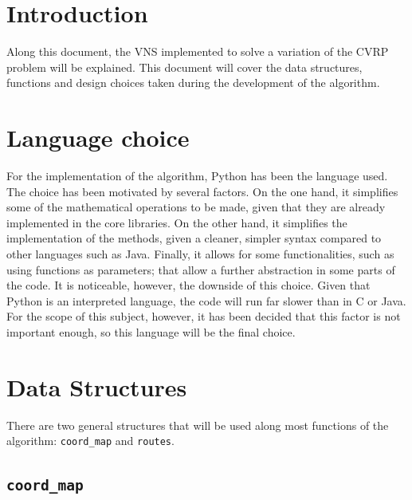 \documentclass[11pt]{article}
\begin{document}
\setcounter{page}{0}
\tableofcontents
\newpage

\renewcommand\tablename{Tabla}

\section{Introduction}

Along this document, the VNS implemented to solve a variation of the CVRP problem will be explained. This document will cover the data structures, functions and design choices taken during the development of the algorithm. \\

\section{Language choice}

For the implementation of the algorithm, Python has been the language used. The choice has been motivated by several factors. On the one hand, it simplifies some of the mathematical operations to be made, given that they are already implemented in the core libraries. On the other hand, it simplifies the implementation of the methods, given a cleaner, simpler syntax compared to other languages such as Java. Finally, it allows for some functionalities, such as using functions as parameters; that allow a further abstraction in some parts of the code. It is noticeable, however, the downside of this choice. Given that Python is an interpreted language, the code will run far slower than in C or Java. For the scope of this subject, however, it has been decided that this factor is not important enough, so this language will be the final choice. \\

\section{Data Structures}

There are two general structures that will be used along most functions of the algorithm: \texttt{coord\_map} and \texttt{routes}. 

\subsection{\texttt{coord\_map}}
\end{document}
